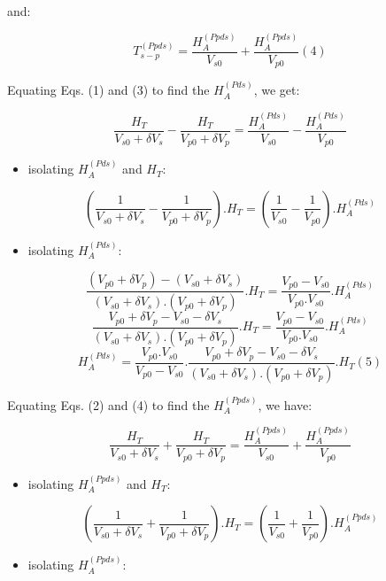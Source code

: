 \documentclass[11pt]{article}
\providecommand{\tightlist}{%
      \setlength{\itemsep}{0pt}\setlength{\parskip}{0pt}}
\begin{document}
    and:

    \[
T_{s - p}^{(Ppds)} = \frac{H_{A}^{(Ppds)}}{V_{s0}}  +  \frac{H_{A}^{(Ppds)}}{V_{p0}} (4)
\]

    Equating Eqs. (1) and (3) to find the \(H_{A}^{(Pds)}\), we get:

    \[
 \frac{H_{T}}{V_{s0} + \delta V_{s}} - \frac{H_{T}}{V_{p0} + \delta V_{p}} = \frac{H_{A}^{(Pds)}}{V_{s0}}  -  \frac{H_{A}^{(Pds)}}{V_{p0}}
\]

    \begin{itemize}
\tightlist
\item
  isolating \(H_{A}^{(Pds)}\) and \(H_{T}\):
\end{itemize}

    \[
 (\frac{1}{V_{s0} + \delta V_{s}} - \frac{1}{V_{p0} + \delta V_{p}}) .  H_{T} = (\frac{1}{V_{s0}}  -  \frac{1}{V_{p0}}) . H_{A}^{(Pds)}
\]

    \begin{itemize}
\tightlist
\item
  isolating \(H_{A}^{(Pds)}\):
\end{itemize}

    \[
 \frac{(V_{p0} + \delta V_{p}) - (V_{s0} + \delta V_{s})}{(V_{s0} + \delta V_{s}) . (V_{p0} + \delta V_{p})} . H_{T} = \frac{V_{p0}-V_{s0}}{V_{p0} . V_{s0}} .  H_{A}^{(Pds)}
\] \[
 \frac{V_{p0} + \delta V_{p} - V_{s0} - \delta V_{s}}{(V_{s0} + \delta V_{s}) . (V_{p0} + \delta V_{p})} . H_{T} = \frac{V_{p0}-V_{s0}}{V_{p0} . V_{s0}} .  H_{A}^{(Pds)}
\] \[
H_{A}^{(Pds)} = \frac{V_{p0} . V_{s0}}{V_{p0}-V_{s0}} . \frac{V_{p0} + \delta V_{p} - V_{s0} - \delta V_{s}}{(V_{s0} + \delta V_{s}) . (V_{p0} + \delta V_{p})} . H_{T} (5)
\] 

    Equating Eqs. (2) and (4) to find the \(H_{A}^{(Ppds)}\), we have:

    \[
\frac{H_{T}}{V_{s0} + \delta V_{s}} + \frac{H_{T}}{V_{p0} + \delta V_{p}} = \frac{H_{A}^{(Ppds)}}{V_{s0}}  +  \frac{H_{A}^{(Ppds)}}{V_{p0}}
\]

    \begin{itemize}
\tightlist
\item
  isolating \(H_{A}^{(Ppds)}\) and \(H_{T}\):
\end{itemize}

    \[
 (\frac{1}{V_{s0} + \delta V_{s}} + \frac{1}{V_{p0} + \delta V_{p}}) .  H_{T} = (\frac{1}{V_{s0}}  +  \frac{1}{V_{p0}}) . H_{A}^{(Ppds)}
\]

    \begin{itemize}
\tightlist
\item
  isolating \(H_{A}^{(Ppds)}\):
\end{itemize}
\end{document}
